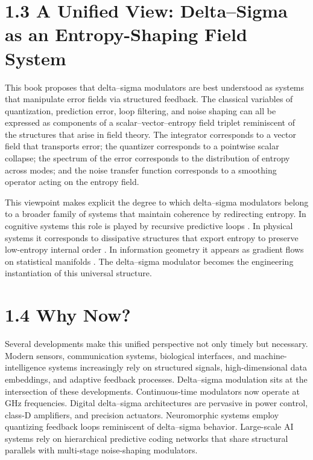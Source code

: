 \section*{1.3 A Unified View: Delta--Sigma as an Entropy-Shaping Field System}

This book proposes that delta--sigma modulators are best understood as systems that manipulate error fields via structured feedback. The classical variables of quantization, prediction error, loop filtering, and noise shaping can all be expressed as components of a scalar--vector--entropy field triplet reminiscent of the structures that arise in field theory. The integrator corresponds to a vector field that transports error; the quantizer corresponds to a pointwise scalar collapse; the spectrum of the error corresponds to the distribution of entropy across modes; and the noise transfer function corresponds to a smoothing operator acting on the entropy field.

This viewpoint makes explicit the degree to which delta--sigma modulators belong to a broader family of systems that maintain coherence by redirecting entropy. In cognitive systems this role is played by recursive predictive loops \citep{friston2010free,cheng2025cognitiveloopinsituoptimization}. In physical systems it corresponds to dissipative structures that export entropy to preserve low-entropy internal order \citep{willems1972dissipative}. In information geometry it appears as gradient flows on statistical manifolds \citep{amari2016information}. The delta--sigma modulator becomes the engineering instantiation of this universal structure.

\section*{1.4 Why Now?}

Several developments make this unified perspective not only timely but necessary. Modern sensors, communication systems, biological interfaces, and machine-intelligence systems increasingly rely on structured signals, high-dimensional data embeddings, and adaptive feedback processes. Delta--sigma modulation sits at the intersection of these developments. Continuous-time modulators now operate at GHz frequencies. Digital delta--sigma architectures are pervasive in power control, class-D amplifiers, and precision actuators. Neuromorphic systems employ quantizing feedback loops reminiscent of delta--sigma behavior. Large-scale AI systems rely on hierarchical predictive coding networks that share structural parallels with multi-stage noise-shaping modulators.

